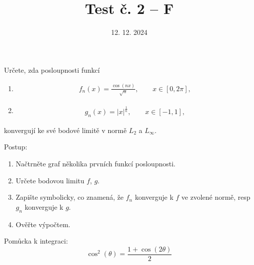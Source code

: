 \documentclass{article}
\begin{document}
\title{Test č. 2 -- F}
\date{12. 12. 2024}
\author{}
\maketitle


\noindent
Určete, zda posloupnosti funkcí

\begin{enumerate}[label=(\alph*)]
\item
\begin{align*}
        f_n(x) = \frac{\cos (nx)}{\sqrt{n}}, \qquad x\in[0,2\pi],
\end{align*}

\item
\begin{align*}
        g_n(x) = |x|^{\frac{1}{n}}, \qquad x\in[-1,1],
\end{align*}
\end{enumerate}

konvergují ke své bodové limitě v normě $L_2$ a $L_\infty$.

\vspace{2cm}

Postup:
\begin{enumerate}
\item Načtrněte graf několika prvních funkcí posloupnosti.
\item Určete bodovou limitu $f$, $g$.
\item Zapište symbolicky, co znamená, že $f_n$ konverguje k $f$ ve zvolené normě, resp $g_n$ konverguje k $g$.
\item Ověřte výpočtem.
\end{enumerate}


\vfill
Pomůcka k integraci:
\[\cos^2(\theta) = \frac{1 + \cos(2\theta)}{2}\]

\end{document}
